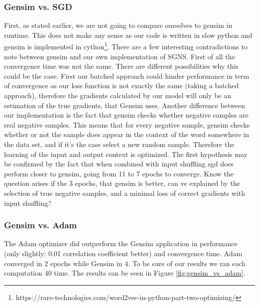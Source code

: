 \subsubsection{Gensim vs. SGD}
First, as stated earlier, we are not going to compare ourselves to gensim in runtime. This does not make any sense as our code is written in slow python and gensim is implemented in cython\footnote{https://rare-technologies.com/word2vec-in-python-part-two-optimizing/}. 
There are a few interesting contradictions to note between gensim and our own implementation of SGNS. First of all the convergence time was not the same. There are different possibilities why this could be the case. First our batched approach could hinder performance in term of convergence as our loss function is not exactly the same (taking a batched approach), therefore the gradients calculated by our model will only be an estimation of the true gradients, that Gensim uses. Another difference between our implementation is the fact that gensim checks whether negative samples are real negative samples. This means that for every negative sample, gensim checks whether or not the sample does appear in the context of the word somewhere in the data set, and if it's the case select a new random sample. Therefore the learning of the input and output context is optimized. 
The first hypothesis may be confirmed by the fact that when combined with input shuffling sgd does perform closer to gensim, going from 11 to 7 epochs to converge. Know the question arises if the 3 epochs, that gensim is better, can ve explained by the selection of true negative samples, and a minimal loss of correct gradients with input shuffling?

\subsubsection{Gensim vs. Adam}
The Adam optimizer did outperform the Gensim application in performance (only slightly: 0.01 correlation coefficient better) and convergence time. Adam converged in 2 epochs while Gensim in 4. To be sure of our results we ran each computation 40 time. The results can be  seen in Figure \ref{fig:gensim_vs_adam}.

